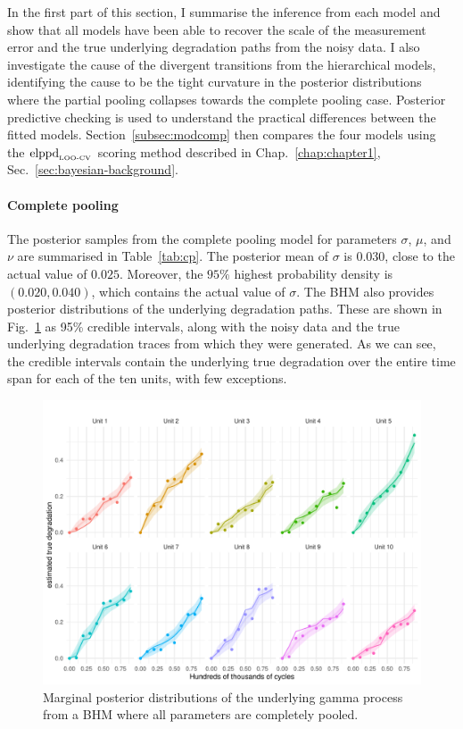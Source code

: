 In the first part of this section, I summarise the inference from each model and show that all models have been able to recover the scale of the measurement error and the true underlying degradation paths from the noisy data. I also investigate the cause of the divergent transitions from the hierarchical models, identifying the cause to be the tight curvature in the posterior distributions where the partial pooling collapses towards the complete pooling case. Posterior predictive checking is used to understand the practical differences between the fitted models. Section~\ref{subsec:modcomp} then compares the four models using the $\hbox{elppd}_{\text{\tiny{LOO-CV}}}$ scoring method described in Chap.~\ref{chap:chapter1}, Sec.~\ref{sec:bayesian-background}.



\paragraph{Complete pooling} The posterior samples from the complete pooling model for parameters $\sigma$, $\mu$, and $\nu$ are summarised in Table~\ref{tab:cp}. The posterior mean of $\sigma$ is $0.030$, close to the actual value of $0.025$. Moreover, the $95\%$ highest probability density is $(0.020, 0.040)$, which contains the actual value of $\sigma$. The BHM also provides posterior distributions of the underlying degradation paths. These are shown in Fig.~\ref{fig:cp_filtered} as 95\% credible intervals, along with the noisy data and the true underlying degradation traces from which they were generated. As we can see, the credible intervals contain the underlying true degradation over the entire time span for each of the ten units, with few exceptions.



\begin{figure}
   \centering
   \includegraphics[width=0.8\columnwidth]{./figures/ch-5/plot-cp-filtered.pdf}
   \caption{Marginal posterior distributions of the underlying gamma process from a BHM where all parameters are completely pooled.}
   \label{fig:cp_filtered}
\end{figure}

